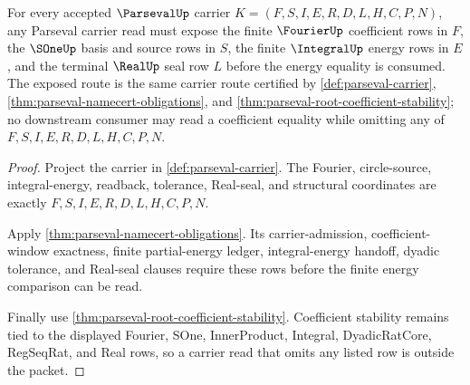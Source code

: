\begin{theorem}
\label{thm:parseval-finite-fourier-carrier-admission}
For every accepted $\ParsevalUp$ carrier $K=(F,S,I,E,R,D,L,H,C,P,N)$, any Parseval carrier read must expose the finite $\FourierUp$ coefficient rows in $F$, the $\SOneUp$ basis and source rows in $S$, the finite $\IntegralUp$ energy rows in $E$, and the terminal $\RealUp$ seal row $L$ before the energy equality is consumed. The exposed route is the same carrier route certified by \autoref{def:parseval-carrier}, \autoref{thm:parseval-namecert-obligations}, and \autoref{thm:parseval-root-coefficient-stability}; no downstream consumer may read a coefficient equality while omitting any of $F,S,I,E,R,D,L,H,C,P,N$.
\end{theorem}
\begin{proof}
Project the carrier in \autoref{def:parseval-carrier}. The Fourier, circle-source, integral-energy, readback, tolerance, Real-seal, and structural coordinates are exactly $F,S,I,E,R,D,L,H,C,P,N$.

Apply \autoref{thm:parseval-namecert-obligations}. Its carrier-admission, coefficient-window exactness, finite partial-energy ledger, integral-energy handoff, dyadic tolerance, and Real-seal clauses require these rows before the finite energy comparison can be read.

Finally use \autoref{thm:parseval-root-coefficient-stability}. Coefficient stability remains tied to the displayed Fourier, SOne, InnerProduct, Integral, DyadicRatCore, RegSeqRat, and Real rows, so a carrier read that omits any listed row is outside the packet.
\end{proof}


